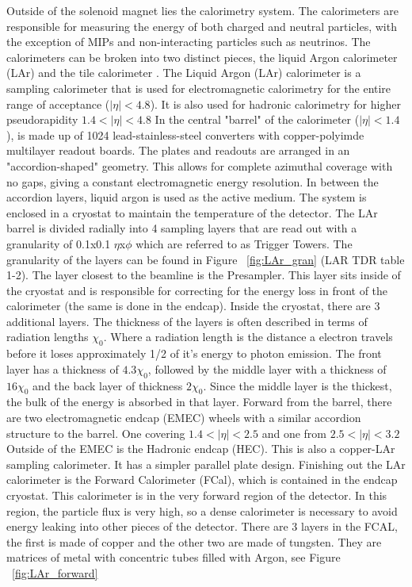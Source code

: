 Outside of the solenoid magnet lies the calorimetry system. The calorimeters are responsible for measuring the energy of both charged and neutral particles, with the exception of MIPs and non-interacting particles such as neutrinos. The calorimeters can be broken into two distinct pieces, the liquid Argon calorimeter (LAr)\cite{CERN-LHCC-96-041} and the tile calorimeter \cite{CERN-LHCC-96-042}. \linebreak
\indent The Liquid Argon (LAr) calorimeter is a sampling calorimeter that is used for electromagnetic calorimetry for the entire range of acceptance (${|\eta{}|<4.8}$). It is also used for hadronic calorimetry for higher pseudorapidity ${1.4<|\eta{}|<4.8}$ In the central "barrel" of the calorimeter (${|\eta{}| < 1.4}$), is made up of 1024 lead-stainless-steel converters with copper-polyimde multilayer readout boards. The plates and readouts are arranged in an "accordion-shaped" geometry. This allows for complete azimuthal coverage with no gaps, giving a constant electromagnetic energy resolution. In between the accordion layers, liquid argon is used as the active medium. The system is enclosed in a cryostat to maintain the temperature of the detector. The LAr barrel is divided radially into 4 sampling layers that are read out with a granularity of 0.1x0.1 ${\eta}$x${\phi}$ which are referred to as Trigger Towers. The granularity of the layers can be found in Figure ~\ref{fig:LAr_gran} (LAR TDR table 1-2). The layer closest to the beamline is the Presampler. This layer sits inside of the cryostat and is responsible for  correcting for the energy loss in front of the calorimeter (the same is done in the endcap). Inside the cryostat, there are 3 additional layers. The thickness of the layers is often described in terms of radiation lengths ${\chi_{0}}$. Where a radiation length is the distance a electron travels before it loses approximately 1/2 of it's energy to photon emission.  The front layer has a thickness of ${4.3\chi_{0}}$, followed by the middle layer with a thickness of ${16\chi_{0}}$ and the back layer of thickness ${2\chi_{0}}$. Since the middle layer is the thickest, the bulk of the energy is absorbed in that layer. \linebreak 
\indent Forward from the barrel, there are two electromagnetic endcap (EMEC) wheels with a similar accordion structure to the barrel. One covering ${1.4 < |\eta{}| < 2.5}$ and one from ${2.5 < |\eta{}| < 3.2}$ Outside of the EMEC is the Hadronic endcap (HEC). This is also a copper-LAr sampling calorimeter. It has a simpler parallel plate design. Finishing out the LAr calorimeter is the Forward Calorimeter (FCal), which is contained in the endcap cryostat. This calorimeter is in the very forward region of the detector. In this region, the particle flux is very high, so a dense calorimeter is necessary to avoid energy leaking into other pieces of the detector. There are 3 layers in the FCAL, the first is made of copper and the other two are made of tungsten. They are matrices of metal with concentric tubes filled with Argon, see Figure ~\ref{fig:LAr_forward} \linebreak

